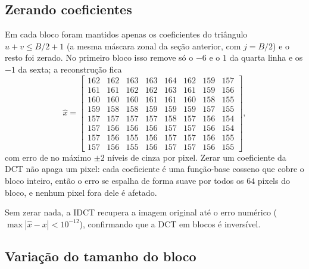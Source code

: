 \documentclass[11pt,a4paper]{article}
\begin{document}
\subsection*{Zerando coeficientes}

Em cada bloco foram mantidos apenas os coeficientes do triângulo $u+v\le B/2+1$ (a
mesma máscara zonal da seção anterior, com $j=B/2$) e o resto foi zerado. No primeiro
bloco isso remove só o $-6$ e o $1$ da quarta linha e os $-1$ da sexta; a reconstrução
fica
\[
\hat{x} = \begin{bmatrix}
162 & 162 & 163 & 163 & 164 & 162 & 159 & 157\\
161 & 161 & 162 & 162 & 163 & 161 & 159 & 156\\
160 & 160 & 160 & 161 & 161 & 160 & 158 & 155\\
159 & 158 & 158 & 159 & 159 & 159 & 157 & 155\\
157 & 157 & 157 & 157 & 158 & 157 & 156 & 154\\
157 & 156 & 156 & 156 & 157 & 157 & 156 & 154\\
157 & 156 & 155 & 156 & 157 & 157 & 156 & 155\\
157 & 156 & 155 & 156 & 157 & 157 & 156 & 155
\end{bmatrix},
\]
com erro de no máximo $\pm2$ níveis de cinza por pixel. Zerar um coeficiente da DCT não
apaga um pixel: cada coeficiente é uma função-base cosseno que cobre o bloco inteiro,
então o erro se espalha de forma suave por todos os $64$ pixels do bloco, e nenhum
pixel fora dele é afetado.

Sem zerar nada, a IDCT recupera a imagem original até o erro numérico
($\max|\hat{x}-x| < 10^{-12}$), confirmando que a DCT em blocos é inversível.

\subsection*{Variação do tamanho do bloco}
\end{document}
